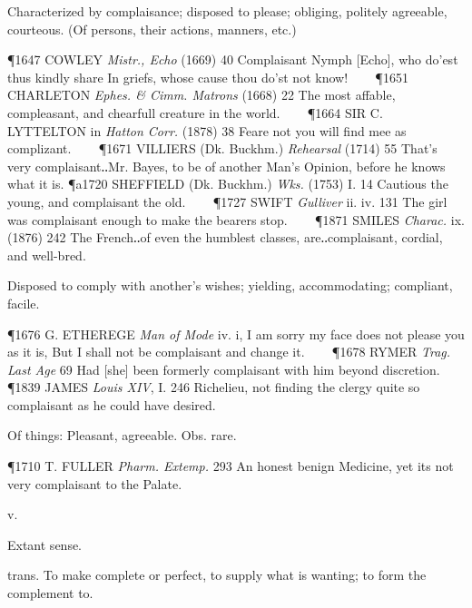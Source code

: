 \begin{description}[wide, labelwidth=!, labelindent=0pt]
\begin{myenumerate}

 Characterized by complaisance; disposed to please; obliging, politely agreeable, courteous. (Of persons, their actions, manners, etc.)

\P 1647 COWLEY  \textit{Mistr., Echo} (1669) 40 Complaisant Nymph [Echo], who do'est thus kindly share In griefs, whose cause thou do'st not know!    
\P 1651 CHARLETON  \textit{Ephes. \& Cimm. Matrons} (1668) 22 The most affable, compleasant, and chearfull creature in the world.    
\P 1664 SIR C. LYTTELTON in \textit{Hatton Corr.} (1878) 38 Feare not you will find mee as complizant.    
\P 1671 VILLIERS  (Dk. Buckhm.) \textit{Rehearsal} (1714) 55 That's very complaisant‥Mr. Bayes, to be of another Man's Opinion, before he knows what it is.
\P a1720 SHEFFIELD  (Dk. Buckhm.) \textit{Wks.} (1753) I. 14 Cautious the young, and complaisant the old.    
\P 1727 SWIFT  \textit{Gulliver} ii. iv. 131 The girl was complaisant enough to make the bearers stop.    
\P 1871 SMILES  \textit{Charac.} ix. (1876) 242 The French‥of even the humblest classes, are‥complaisant, cordial, and well-bred.

 Disposed to comply with another's wishes; yielding, accommodating; compliant, facile.

\P 1676 G. ETHEREGE  \textit{Man of Mode} iv. i, I am sorry my face does not please you as it is, But I shall not be complaisant and change it.    
\P 1678 RYMER  \textit{Trag. Last Age} 69 Had [she] been formerly complaisant with him beyond discretion.    
\P 1839 JAMES  \textit{Louis XIV}, I. 246 Richelieu, not finding the clergy quite so complaisant as he could have desired.

 Of things: Pleasant, agreeable. Obs. rare.

\P 1710 T. FULLER  \textit{Pharm. Extemp.} 293 An honest benign Medicine, yet its not very complaisant to the Palate.
\end{myenumerate}


 v.

\noindent {}

\noindent [f. prec.]
\vspace{-0.3cm}

\begin{myenumerate}

 Extant sense.

 trans. To make complete or perfect, to supply what is wanting; to form the complement to.


\end{myenumerate}
\end{description}
